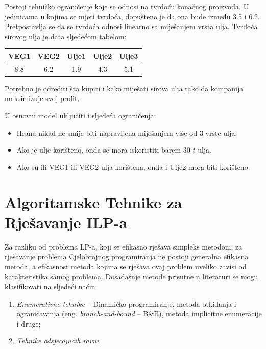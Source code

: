\documentclass[a4paper, utf8, 11pt, colorlinks]{book}
\begin{document}
\begin{enumerate}
Postoji tehničko ograničenje koje se odnosi na tvrdoću konačnog proizvoda. U jedinicama u kojima se mjeri tvrdoća, dopušteno je da ona bude između 3.5 i 6.2. Pretpostavlja se da se tvrdoća odnosi linearno sa miješanjem vrsta ulja. Tvrdoća sirovog ulja je data sljedećom tabelom: 
\begin{table}[H]
	\centering
	\begin{tabular}{ccccc}
		    VEG1 & VEG2 & Ulje1 & Ulje2 & Ulje3 \\ \hline
		    8.8  & 6.2  & 1.9   & 4.3   & 5.1   \\
    \end{tabular} 
\end{table}

Potrebno je odrediti šta kupiti i kako miješati sirova ulja tako da kompanija maksimizuje svoj profit. 

U osnovni model uključiti i sljedeća ograničenja:
\begin{itemize}
	\item Hrana nikad ne smije biti napravljena miješanjem više od 3 vrste ulja. 
	\item Ako je ulje korišteno, onda se mora iskoristiti barem 30 $t$ ulja.
	\item Ako su ili VEG1 ili VEG2 ulja korištena, onda i Ulje2 mora biti korišteno.  
\end{itemize}

\end{enumerate}                                                       


 \chapter{Algoritamske Tehnike za Rješavanje ILP-a}
 
 Za razliku od problema LP-a, koji se efikasno rješava simpleks metodom, za rješavanje problema Cjelobrojnog programiranja ne postoji generalna efikasna metoda, a efikasnost metoda kojima se rješava ovaj problem uveliko zavisi od karakteristika samog problema. Dosadašnje metode prisutne u literaturi se mogu klasifikovati na sljedeći način:
 \begin{enumerate}
     \item \emph{Enumerativne tehnike} -- Dinamičko programiranje, metoda otkidanja i ograničavanja (eng. \emph{branch-and-bound} -- B\&B), metoda implicitne enumeracije i druge;
     \item \emph{Tehnike odsjecajućih ravni}.
 \end{enumerate}
\end{document}
